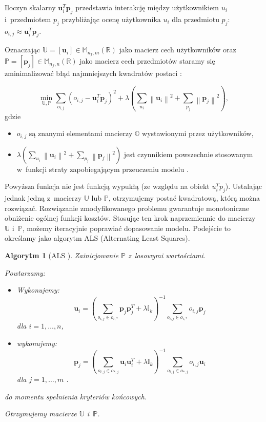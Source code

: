 \documentclass[12pt,a4paper]{report}
\newtheorem{algorytm}[df]{Algorytm}
\newcommand{\setR}{\mathbb{R}}
\newcommand{\norm}[2][]{\left\| {#2} \right\|_{#1}}
\begin{document}
Iloczyn skalarny $\mathbf{u}_i^T \mathbf{p}_j$ przedstawia interakcję między użytkownikiem $u_i$ i~przedmiotem $p_j$ przybliżając ocenę użytkownika $u_i$ dla przedmiotu $p_j$: $o_{i,j} \approx \mathbf{u}_i^T \mathbf{p}_j$. 

Oznaczając $\mathbb{U}=[\mathbf{u}_i] \in \mathbb{M}_{n_f,m}(\setR)$ jako macierz cech użytkowników oraz $\mathbb{P}=[\mathbf{p}_j] \in \mathbb{M}_{n_f,n}(\setR)$ jako macierz cech przedmiotów staramy się zminimalizować błąd najmniejszych kwadratów postaci {\citep{mcvals}}:

$$
\min_{\mathbb{U}, \mathbb{P}} \sum_{o_{i,j}} (o_{i,j} - \mathbf{u}_i^T \mathbf{p}_j)^2 + \lambda (\sum_{u_i} \norm{\mathbf{u}_i}^2 + \sum_{p_j} \norm{\mathbf{p}_j}^2),
$$
gdzie 
\begin{itemize}
\item $o_{i,j}$ są znanymi elementami macierzy $\mathbb{O}$ wystawionymi przez użytkowników,
\item $\lambda (\sum_{u_i} \norm{\mathbf{u}_i}^2 + \sum_{p_j} \norm{\mathbf{p}_j}^2)$ jest czynnikiem powszechnie stosowanym w~funkcji straty zapobiegającym przeuczeniu modelu .
\end{itemize}

Powyższa funkcja nie jest funkcją wypukłą (ze względu na obiekt $u_i^Tp_j$). Ustalając jednak jedną z~macierzy $\mathbb{U}$ lub $\mathbb{P}$, otrzymujemy postać kwadratową, którą można rozwiązać. Rozwiązanie zmodyfikowanego problemu gwarantuje monotoniczne obniżenie ogólnej funkcji kosztów. Stosując ten krok naprzemiennie do macierzy $\mathbb{U}$ i~$\mathbb{P}$, możemy iteracyjnie poprawiać dopasowanie modelu. Podejście to określamy jako algorytm ALS (Alternating Least Squares).

\begin{algorytm}[ALS {\citep{mcvals}}]
Zainicjowanie $\mathbb{P}$ z~losowymi wartościami.

Powtarzamy:
\begin{itemize}
\item Wykonujemy:
$$
\mathbf{u}_i = (\sum_{o_{i,j} \in o_{i,*}} \mathbf{p}_j \mathbf{p}_j^T + \lambda \mathbb{I}_k)^{-1} \sum_{o_{i,j} \in o_{i,*}} o_{i,j}\mathbf{p}_j
$$
dla $i = 1, \ldots, n $,
\item wykonujemy:
$$
\mathbf{p}_j = (\sum_{o_{i,j} \in o_{*,j}} \mathbf{u}_i \mathbf{u}_i^T + \lambda \mathbb{I}_k)^{-1} \sum_{o_{i,j} \in o_{*,j}} o_{i,j}\mathbf{u}_i
$$
dla $j = 1, \ldots, m$ .
\end{itemize}
do momentu spełnienia kryteriów końcowych.

Otrzymujemy macierze $\mathbb{U}$ i~$\mathbb{P}$.
\end{algorytm}
\end{document}
